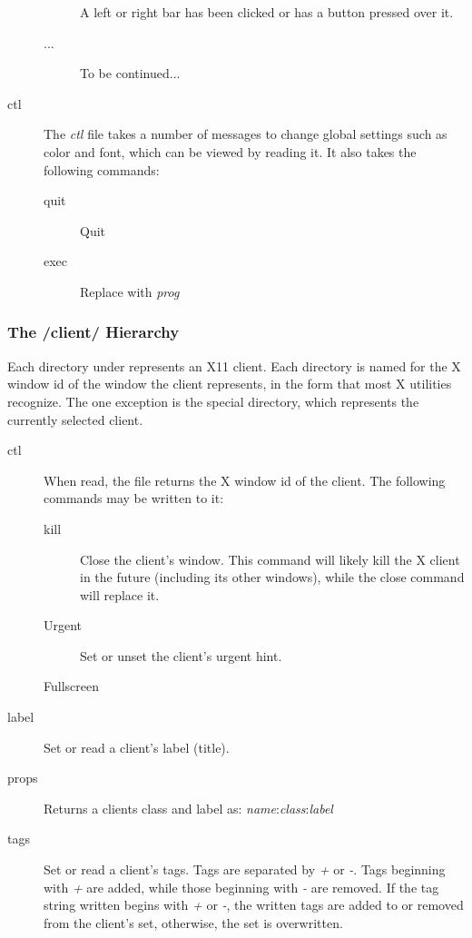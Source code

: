 \begin{description}
\begin{description}
		A left or right bar has been clicked or has a
		button pressed over it.
	\item[...] To be continued...
	\end{description}
\item[ctl] The \emph{ctl} file takes a number of messages to
	change global settings such as color and font, which can
	be viewed by reading it. It also takes the following
	commands:
	\begin{description}
	\item[quit] Quit 
	\item[exec ] Replace  with
		\emph{prog}
	\end{description}
\end{description}

\subsubsection{The /client/ Hierarchy}

Each directory under  represents an X11 client.
Each directory is named for the X window id of the window the
client represents, in the form that most X utilities recognize.
The one exception is the special  directory, which
represents the currently selected client.

\begin{description}
\item[ctl] When read, the  file returns the X window id
	of the client. The following commands may be written to
	it:
	\begin{description}
	\item[kill] Close the client's window. This command will
		likely kill the X client in the future
		(including its other windows), while the close
		command will replace it.
	\item[Urgent] Set or unset the client's urgent
		hint.
	\item[Fullscreen]

	\end{description}
\item[label] Set or read a client's label (title).
\item[props] Returns a clients class and label as:
	\emph{name}:\emph{class}:\emph{label}
\item[tags] Set or read a client's tags. Tags are separated by
	\emph{+} or \emph{-}. Tags beginning with \emph{+} are
	added, while those beginning with \emph{-} are removed.
	If the tag string written begins with \emph{+} or
	\emph{-}, the written tags are added to or removed from
	the client's set, otherwise, the set is overwritten.
\end{description}

